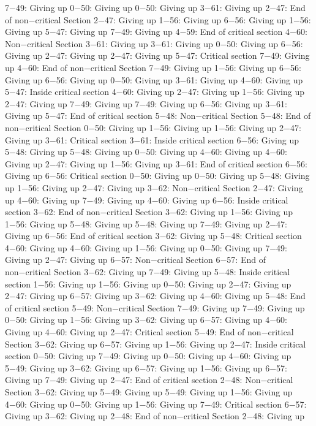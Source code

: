 7−49: Giving up
0−50: Giving up
0−50: Giving up
3−61: Giving up
2−47: End of non−critical Section
2−47: Giving up
1−56: Giving up
6−56: Giving up
1−56: Giving up
5−47: Giving up
7−49: Giving up
4−59: End of critical section
4−60: Non−critical Section
3−61: Giving up
3−61: Giving up
0−50: Giving up
6−56: Giving up
2−47: Giving up
2−47: Giving up
5−47: Critical section
7−49: Giving up
4−60: End of non−critical Section
7−49: Giving up
1−56: Giving up
6−56: Giving up
6−56: Giving up
0−50: Giving up
3−61: Giving up
4−60: Giving up
5−47: Inside critical section
4−60: Giving up
2−47: Giving up
1−56: Giving up
2−47: Giving up
7−49: Giving up
7−49: Giving up
6−56: Giving up
3−61: Giving up
5−47: End of critical section
5−48: Non−critical Section
5−48: End of non−critical Section
0−50: Giving up
1−56: Giving up
1−56: Giving up
2−47: Giving up
3−61: Critical section
3−61: Inside critical section
6−56: Giving up
5−48: Giving up
5−48: Giving up
0−50: Giving up
4−60: Giving up
4−60: Giving up
2−47: Giving up
1−56: Giving up
3−61: End of critical section
6−56: Giving up
6−56: Critical section
0−50: Giving up
0−50: Giving up
5−48: Giving up
1−56: Giving up
2−47: Giving up
3−62: Non−critical Section
2−47: Giving up
4−60: Giving up
7−49: Giving up
4−60: Giving up
6−56: Inside critical section
3−62: End of non−critical Section
3−62: Giving up
1−56: Giving up
1−56: Giving up
5−48: Giving up
5−48: Giving up
7−49: Giving up
2−47: Giving up
6−56: End of critical section
3−62: Giving up
5−48: Critical section
4−60: Giving up
4−60: Giving up
1−56: Giving up
0−50: Giving up
7−49: Giving up
2−47: Giving up
6−57: Non−critical Section
6−57: End of non−critical Section
3−62: Giving up
7−49: Giving up
5−48: Inside critical section
1−56: Giving up
1−56: Giving up
0−50: Giving up
2−47: Giving up
2−47: Giving up
6−57: Giving up
3−62: Giving up
4−60: Giving up
5−48: End of critical section
5−49: Non−critical Section
7−49: Giving up
7−49: Giving up
0−50: Giving up
1−56: Giving up
3−62: Giving up
6−57: Giving up
4−60: Giving up
4−60: Giving up
2−47: Critical section
5−49: End of non−critical Section
3−62: Giving up
6−57: Giving up
1−56: Giving up
2−47: Inside critical section
0−50: Giving up
7−49: Giving up
0−50: Giving up
4−60: Giving up
5−49: Giving up
3−62: Giving up
6−57: Giving up
1−56: Giving up
6−57: Giving up
7−49: Giving up
2−47: End of critical section
2−48: Non−critical Section
3−62: Giving up
5−49: Giving up
5−49: Giving up
1−56: Giving up
4−60: Giving up
0−50: Giving up
1−56: Giving up
7−49: Critical section
6−57: Giving up
3−62: Giving up
2−48: End of non−critical Section
2−48: Giving up

